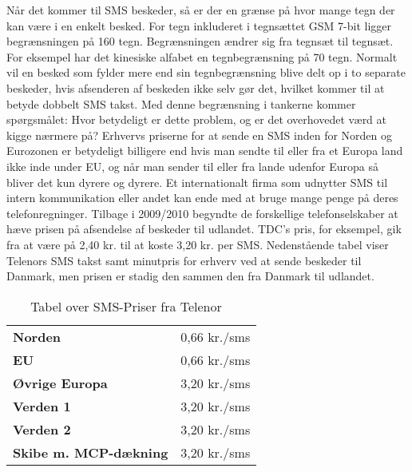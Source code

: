 Når det kommer til SMS beskeder, så er der en grænse på hvor mange tegn der kan være i en enkelt besked. For tegn inkluderet i tegnsættet GSM 7-bit ligger begrænsningen på 160 tegn. Begrænsningen ændrer sig fra tegnsæt til tegnsæt. For eksempel har det kinesiske alfabet en tegnbegrænsning på 70 tegn\cite{Pro_1}. Normalt vil en besked som fylder mere end sin tegnbegrænsning blive delt op i to separate beskeder, hvis afsenderen af beskeden ikke selv gør det, hvilket kommer til at betyde dobbelt SMS takst. Med denne begrænsning i tankerne kommer spørgsmålet: Hvor betydeligt er dette problem, og er det overhovedet værd at kigge nærmere på?
Erhvervs priserne for at sende en SMS inden for Norden og Eurozonen er betydeligt billigere end hvis man sendte til eller fra et Europa land ikke inde under EU, og når man sender til eller fra lande udenfor Europa så bliver det kun dyrere og dyrere. Et internationalt firma som udnytter SMS til intern kommunikation eller andet kan ende med at bruge mange penge på deres telefonregninger. Tilbage i 2009/2010 begyndte de forskellige telefonselskaber at hæve prisen på afsendelse af beskeder til udlandet. TDC's pris, for eksempel, gik fra at være på 2,40 kr. til at koste 3,20 kr. per SMS\cite{Pro_2}. Nedenstående tabel viser Telenors SMS takst samt minutpris for erhverv ved at sende beskeder til Danmark, men prisen er stadig den sammen den fra Danmark til udlandet\cite{Pro_3}.

\begin{table}[H]
\begin{center}
\begin{tabular}{ | l | r |}
    \hline
    \cellcolor{ForestGreen} &  \cellcolor{ForestGreen}\color{white}{\textbf{Sende/Modtage SMS}}\\[2ex] \hline
    \textbf{Norden} & 0,66 kr./sms \\ \hline
    \textbf{EU} & 0,66 kr./sms \\ \hline
    \textbf{Øvrige Europa} & 3,20 kr./sms \\ \hline
    \textbf{Verden 1} & 3,20 kr./sms \\ \hline
    \textbf{Verden 2} & 3,20 kr./sms \\ \hline
    \textbf{Skibe m. MCP-dækning} & 3,20 kr./sms \\ \hline
\end{tabular} 
\caption{Tabel over SMS-Priser fra Telenor ~\cite{Pro_3}}
\end{center}
\end{table}

